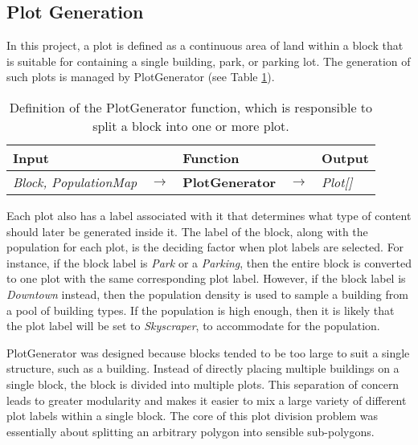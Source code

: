 \subsection{Plot Generation}  

In this project, a plot is defined as a continuous area of land within a block that is suitable for containing a single building, park, or parking lot.
The generation of such plots is managed by PlotGenerator (see Table \ref{table:plotgen}).

\begin{table}[H]
  \centering
  \begin{tabular}{lllll}
    \textbf{Input}                           &               & \textbf{Function}            &               & \textbf{Output}         \\
    \midrule
    \textit{Block, PopulationMap}            & $\rightarrow$ & \textbf{PlotGenerator}       & $\rightarrow$ & \textit{Plot[]}         \\
    \bottomrule
  \end{tabular}

  \caption{Definition of the PlotGenerator function, which is responsible to split a block into one or more plot.}
  \label{table:plotgen}
\end{table}
\vspace{-0.4cm} 

Each plot also has a label associated with it that determines what type of content should later be generated inside it. 
The label of the block, along with the population for each plot, is the deciding factor when plot labels are selected. 
For instance, if the block label is \textit{Park} or a \textit{Parking}, then the entire block is converted to one plot with the same corresponding plot label. 
However, if the block label is \textit{Downtown} instead, then the population density is used to sample a building from a pool of building types. 
If the population is high enough, then it is likely that the plot label will be set to \textit{Skyscraper}, to accommodate for the population. 

PlotGenerator was designed because blocks tended to be too large to suit a single structure, such as a building.
Instead of directly placing multiple buildings on a single block, the block is divided into multiple plots.
This separation of concern leads to greater modularity and makes it easier to mix a large variety of different plot labels within a single block.
The core of this plot division problem was essentially about splitting an arbitrary polygon into sensible sub-polygons. 

